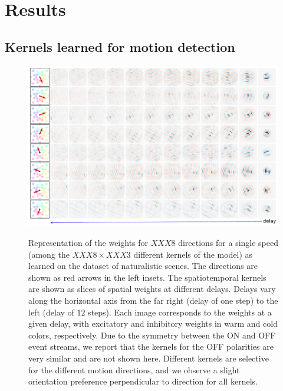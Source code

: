 \documentclass[default]{sn-jnl}%
\theoremstyle{thmstyleone}%
\theoremstyle{thmstyletwo}%
\theoremstyle{thmstylethree}%
\begin{document}
\section{Results}
\label{sec:results}
\subsection{Kernels learned for motion detection}
\begin{figure}[ht!]
    {\centering
    \includegraphics[width=\linewidth]{figures/motion_kernels.pdf}
    }
    \caption{
    	Representation of the weights for $XXX8$ directions for a single speed (among the $XXX8 \times XXX3$ different kernels of the model) as learned on the dataset of naturalistic scenes. The directions are shown as red arrows in the left insets. The spatiotemporal kernels are shown as slices of spatial weights at different delays. Delays vary along the horizontal axis from the far right (delay of one step) to the left (delay of $12$ steps). Each image corresponds to the weights at a given delay, with excitatory and inhibitory weights in warm and cold colors, respectively. Due to the symmetry between the ON and OFF event streams, we report that the kernels for the OFF polarities are very similar and are not shown here.	Different kernels are selective for the different motion directions, and we observe a slight orientation preference perpendicular to direction for all kernels.
	}
    \label{fig:kernels}
\end{figure} 
\end{document}

